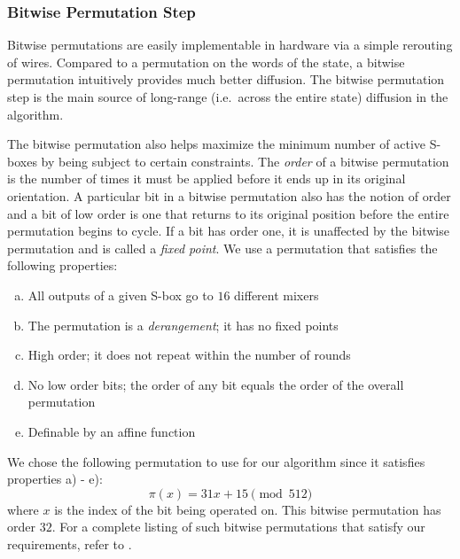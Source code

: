 \subsubsection{Bitwise Permutation Step}
Bitwise permutations are easily implementable in hardware via a simple rerouting of wires.
Compared to a permutation on the words of the state, a bitwise permutation intuitively provides much better diffusion.
The bitwise permutation step is the main source of long-range (i.e.\ across the entire state) diffusion in the algorithm.

The bitwise permutation also helps maximize the minimum number of active S-boxes by being subject to certain constraints.
The \emph{order} of a bitwise permutation is the number of times it must be applied before it ends up in its original orientation.
A particular bit in a bitwise permutation also has the notion of order and a bit of low order is one that returns to its original position before the entire permutation begins to cycle.
If a bit has order one, it is unaffected by the bitwise permutation and is called a \emph{fixed point}.
We use a permutation that satisfies the following properties:
\begin{enumerate}[a)]
\item All outputs of a given S-box go to $16$ different mixers
\item The permutation is a \emph{derangement}; it has no fixed points
\item High order; it does not repeat within the number of rounds
\item No low order bits; the order of any bit equals the order of the overall permutation
\item Definable by an affine function
\end{enumerate}

We chose the following permutation to use for our algorithm since it satisfies properties a) - e):
\begin{equation*}
\pi(x) = 31x + 15 \pmod{512}
\end{equation*}
where $x$ is the index of the bit being operated on.
This bitwise permutation has order $32$.
For a complete listing of such bitwise permutations that satisfy our requirements, refer to \cite{Kelly2014_Thesis}.

